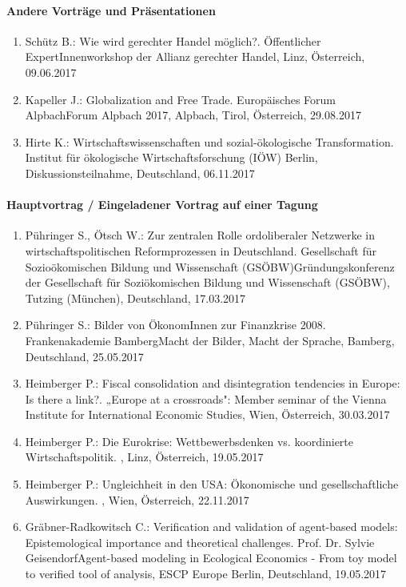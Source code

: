 \paragraph{Andere Vorträge und Präsentationen}
\begin{enumerate}
	\item Schütz B.: Wie wird gerechter Handel möglich?. Öffentlicher ExpertInnenworkshop der Allianz gerechter Handel, Linz, Österreich, 09.06.2017
	\item Kapeller J.: Globalization and Free Trade. Europäisches Forum AlpbachForum Alpbach 2017, Alpbach, Tirol, Österreich, 29.08.2017
	\item Hirte K.: Wirtschaftswissenschaften und sozial-ökologische Transformation. Institut für ökologische Wirtschaftsforschung (IÖW) Berlin, Diskussionsteilnahme, Deutschland, 06.11.2017
\end{enumerate}
\paragraph{Hauptvortrag / Eingeladener Vortrag auf einer Tagung}
\begin{enumerate}
	\item Pühringer S., Ötsch W.: Zur zentralen Rolle ordoliberaler Netzwerke in wirtschaftspolitischen Reformprozessen in Deutschland. Gesellschaft für Sozioökomischen Bildung und Wissenschaft (GSÖBW)Gründungskonferenz der Gesellschaft für Soziökomischen Bildung und Wissenschaft (GSÖBW), Tutzing (München), Deutschland, 17.03.2017
	\item Pühringer S.: Bilder von ÖkonomInnen zur Finanzkrise 2008. Frankenakademie BambergMacht der Bilder, Macht der Sprache, Bamberg, Deutschland, 25.05.2017
	\item Heimberger P.: Fiscal consolidation and disintegration tendencies in Europe: Is there a link?. „Europe at a crossroads": Member seminar of the Vienna Institute for International Economic Studies, Wien, Österreich, 30.03.2017
	\item Heimberger P.: Die Eurokrise: Wettbewerbsdenken vs. koordinierte Wirtschaftspolitik. , Linz, Österreich, 19.05.2017
	\item Heimberger P.: Ungleichheit in den USA: Ökonomische und gesellschaftliche Auswirkungen. , Wien, Österreich, 22.11.2017
	\item Gräbner-Radkowitsch C.: Verification and validation of agent-based models: Epistemological importance and theoretical challenges. Prof. Dr. Sylvie GeisendorfAgent-based modeling in Ecological Economics - From toy model to verified tool of analysis, ESCP Europe Berlin, Deutschland, 19.05.2017
\end{enumerate}
